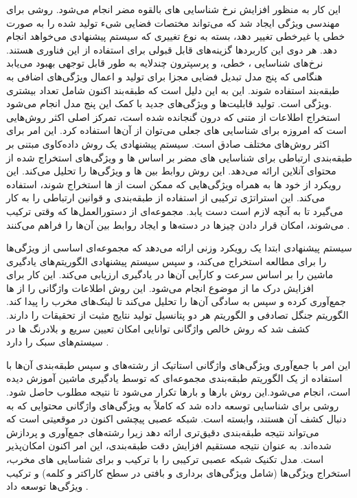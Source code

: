 \documentclass{CSICC2020}
\begin{document}
	این کار به منظور افزایش نرخ شناسایی های بالقوه مضر انجام می‌شود. روشی برای مهندسی ویژگی ایجاد شد که می‌تواند مختصات فضایی شیء تولید شده را به صورت خطی یا غیرخطی تغییر دهد، بسته به نوع تغییری که سیستم پیشنهادی می‌خواهد انجام دهد. هر دوی این کاربردها گزینه‌های قابل قبولی برای استفاده از این فناوری هستند. نرخ‌های شناسایی ،  خطی، و پرسپترون چندلایه به طور قابل توجهی بهبود می‌یابد هنگامی که پنج مدل تبدیل فضایی مجزا برای تولید و اعمال ویژگی‌های اضافی به طبقه‌بند استفاده شوند. این به این دلیل است که طبقه‌بند اکنون شامل تعداد بیشتری ویژگی است. تولید قابلیت‌ها و ویژگی‌های جدید با کمک این پنج مدل انجام می‌شود.\\
	استخراج اطلاعات از متنی که درون  گنجانده شده است، تمرکز اصلی اکثر روش‌هایی است که امروزه برای شناسایی های جعلی می‌توان از آن‌ها استفاده کرد. این امر برای اکثر روش‌های مختلف صادق است. سیستم پیشنهادی یک روش داده‌کاوی مبتنی بر طبقه‌بندی ارتباطی برای شناسایی های مضر بر اساس ها و ویژگی‌های استخراج شده از محتوای آنلاین ارائه می‌دهد. این روش روابط بین ها و ویژگی‌ها را تحلیل می‌کند. این رویکرد از خود ها به همراه ویژگی‌هایی که ممکن است از ها استخراج شوند، استفاده می‌کند. این استراتژی ترکیبی از استفاده از طبقه‌بندی و قوانین ارتباطی را به کار می‌گیرد تا به آنچه لازم است دست یابد. مجموعه‌ای از دستورالعمل‌ها که وقتی ترکیب می‌شوند، امکان قرار دادن چیزها در دسته‌ها و ایجاد روابط بین آن‌ها را فراهم می‌کنند \cite{alzubaidi_detect}.
	
	سیستم پیشنهادی ابتدا یک رویکرد وزنی ارائه می‌دهد که مجموعه‌ای اساسی از ویژگی‌ها را برای مطالعه استخراج می‌کند، و سپس سیستم پیشنهادی الگوریتم‌های یادگیری ماشین را بر اساس سرعت و کارآیی آن‌ها در یادگیری ارزیابی می‌کند. این کار برای افزایش درک ما از موضوع انجام می‌شود. این روش اطلاعات واژگانی را از ها جمع‌آوری کرده و سپس به سادگی آن‌ها را تحلیل می‌کند تا لینک‌های مخرب را پیدا کند. الگوریتم جنگل تصادفی و الگوریتم  هر دو پتانسیل تولید نتایج مثبت از تحقیقات را دارند. کشف شد که روش خالص واژگانی توانایی امکان تعیین سریع و بلادرنگ ها در سیستم‌های سبک را دارد \cite{el-din2021malweb}.
	
	این امر با جمع‌آوری ویژگی‌های واژگانی استاتیک از رشته‌های  و سپس طبقه‌بندی آن‌ها با استفاده از یک الگوریتم طبقه‌بندی مجموعه‌ای که توسط یادگیری ماشین آموزش دیده است، انجام می‌شود.این روش بارها و بارها تکرار می‌شود تا نتیجه مطلوب حاصل شود. روشی برای شناسایی توسعه داده شد که کاملاً به ویژگی‌های واژگانی محتوایی که به دنبال کشف آن هستند، وابسته است. شبکه عصبی پیچشی اکنون در موقعیتی است که می‌تواند نتیجه طبقه‌بندی دقیق‌تری ارائه دهد زیرا رشته‌های  جمع‌آوری و پردازش شده‌اند. به عنوان نتیجه مستقیم افزایش دقت طبقه‌بندی، این امر اکنون امکان‌پذیر است. مدل تکنیک شبکه عصبی ترکیبی را با ترکیب  و  برای شناسایی های مخرب، استخراج ویژگی‌ها (شامل ویژگی‌های برداری و بافتی در سطح کاراکتر و کلمه) و ترکیب ویژگی‌ها توسعه داد \cite{wang2020auto1}.
	
\end{document}
